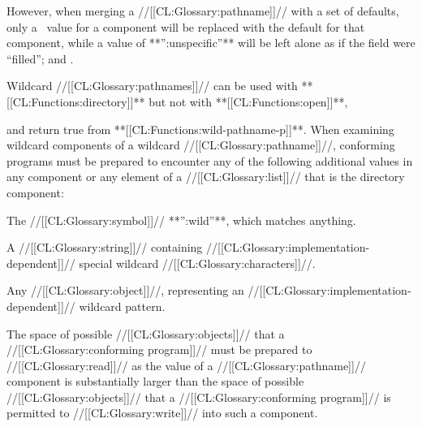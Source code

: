 However, when merging a //[[CL:Glossary:pathname]]// with a set of defaults,
only a \nil\ value for a component 
will be replaced with the default for that component, 
while a value of **'':unspecific''**
will be left alone as if the field were ``filled'';
 and \secref\MergingPathnames.


\endsubsubsubsubsection%

\endsubsubsubsection%


\endsubsubsection%

\endsubsubsection%


  Wildcard //[[CL:Glossary:pathnames]]// can be used with **[[CL:Functions:directory]]** but not with 
  **[[CL:Functions:open]]**,

  and return true from **[[CL:Functions:wild-pathname-p]]**. When examining
  wildcard components of a wildcard //[[CL:Glossary:pathname]]//, conforming programs
  must be prepared to encounter any of the following additional values
  in any component or any element of a //[[CL:Glossary:list]]// that is the directory component:
 
\beginlist

\itemitem{\bull} The //[[CL:Glossary:symbol]]// **'':wild''**, which matches anything.
 
\itemitem{\bull} A //[[CL:Glossary:string]]// containing //[[CL:Glossary:implementation-dependent]]// 
		 special wildcard //[[CL:Glossary:characters]]//.
 
\itemitem{\bull} Any //[[CL:Glossary:object]]//,
		 representing an //[[CL:Glossary:implementation-dependent]]// wildcard pattern.

\endlist 

\endsubsubsection%


  
The space of possible //[[CL:Glossary:objects]]// that a //[[CL:Glossary:conforming program]]// 
must be prepared to //[[CL:Glossary:read]]// 
as the value of a //[[CL:Glossary:pathname]]// component
is substantially larger than the space of possible //[[CL:Glossary:objects]]// 
that a //[[CL:Glossary:conforming program]]// is permitted to //[[CL:Glossary:write]]//
into such a component.

